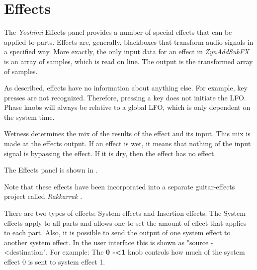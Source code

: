 %
%
%

\section{Effects}
\label{sec:effects}

   The \textsl{Yoshimi} Effects panel provides a number of special effects
   that can be applied to parts.
   Effects are, generally, blackboxes that transform audio signals in a
   specified way. More exactly, the only input data for an effect in
   \textsl{ZynAddSubFX} is an array of samples, which is read on line.
   The output is the transformed array of samples.

   As described, effects have no information about anything else. For
   example, key presses are not recognized. Therefore, pressing a key does
   not initiate the LFO. Phase knobs will always be relative to a global LFO,
   which is only dependent on the system time.

   Wetness determines the mix of the results of the effect and its input.
   This mix is made at the effects output. If an effect is wet, it means that
   nothing of the input signal is bypassing the effect. If it is dry, then
   the effect has no effect.

   The Effects panel is shown in
   .

   Note that these effects have been incorporated into a separate
   guitar-effects project called \textsl{Rakkarrak} \cite{rakarrack}.

   There are two types of effects: System effects and Insertion effects. The
   System effects apply to all parts and allows one to set the amount of effect
   that applies to each part. Also, it is possible to send the output of
   one system effect to another system effect. In the user interface this is
   shown as "source -\textless destination". For example:
   The \textbf{0 -\textless 1} knob controls how
   much of the system effect 0 is sent to system effect 1.

